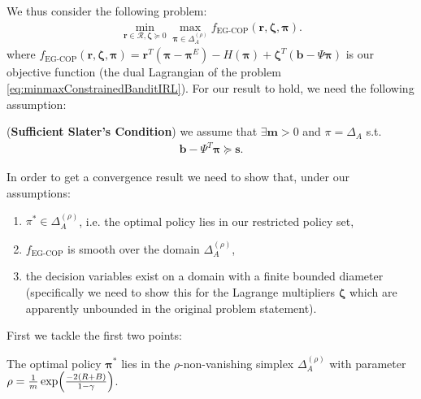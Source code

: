 We thus consider the following problem:
\begin{equation}
    \label{eq:dualConstrainedBanditIRLShannon}
    \begin{aligned}
        \min_{\bm{r}\in\mathcal{R},\bm{\zeta} \succcurlyeq 0}\max_{\bm{\pi}\in\Delta_{A}^{(\rho)}} f_\text{EG-COP}(\bm{r},\bm{\zeta},\bm{\pi}).
    \end{aligned}
\end{equation}
where $f_\text{EG-COP}(\bm{r},\bm{\zeta},\bm{\pi}) = \bm{r}^T(\bm{\pi}-\bm{\pi}^E)-H(\bm{\pi}) + \bm{\zeta}^T (\bm{b}-\Psi \bm{\pi})$ is our objective function (the dual Lagrangian of the problem \ref{eq:minmaxConstrainedBanditIRL}). For our result to hold, we need the following assumption:
\begin{assumption}
    \label{assumption:slater_with_margin_bandit}
    (\textbf{Sufficient Slater's Condition}) we assume that $\exists \mathbf{m} > 0$ and $\pi = \Delta_A$ s.t.
    \begin{align*}
        \bm{b} - \Psi^T \bm{\pi} \succcurlyeq \mathbf{s}.
    \end{align*}
\end{assumption}
\noindent
In order to get a convergence result we need to show that, under our assumptions:
\begin{enumerate}
    \item $\pi^* \in \Delta_{A}^{(\rho)}$, i.e. the optimal policy lies in our restricted policy set,
    \item $f_\text{EG-COP}$ is smooth over the domain $\Delta_{A}^{(\rho)}$,
    \item the decision variables exist on a domain with a finite bounded diameter (specifically we need to show this for the Lagrange multipliers $\bm{\zeta}$ which are apparently unbounded in the original problem statement).
\end{enumerate}

First we tackle the first two points:

\begin{proposition}
    \label{prop:optimal_solution_in_simplex} The optimal policy $\bm{\pi}^*$ lies in the $\rho$-non-vanishing simplex $\Delta_A^{(\rho)}$ with parameter $\rho = \frac{1}{m} \exp \Bigl(\frac{-2(R+B)}{1-\gamma}\Bigr)$.
\end{proposition}

